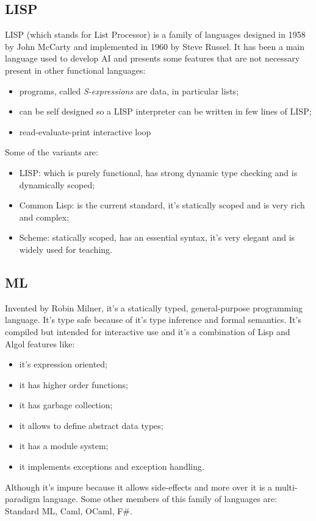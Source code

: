 \subsection{LISP}
LISP (which stands for List Processor) is a family of languages designed in 1958 by John McCarty and implemented in 1960 by Steve Russel.
It has been a main language used to develop AI and presents some features that are not necessary present in other functional languages:
\begin{itemize}
    \item programs, called \emph{S-expressions} are data, in particular lists;
    \item can be self designed so a LISP interpreter can be written in few lines of LISP;
    \item read-evaluate-print interactive loop
\end{itemize}

Some of the variants are:
\begin{itemize}
    \item LISP: which is purely functional, has strong dynamic type checking and is dynamically scoped;
    \item Common Lisp: is the current standard, it's statically scoped and is very rich and complex;
    \item Scheme: statically scoped, has an essential syntax, it's very elegant and is widely used for teaching.
\end{itemize}

\subsection{ML}
Invented by Robin Milner, it's a statically typed, general-purpose programming language.
It's type safe because of it's type inference and formal semantics.
It's compiled but intended for interactive use and it's a combination of Lisp and Algol features like:
\begin{itemize}
    \item it's expression oriented;
    \item it has higher order functions;
    \item it has garbage collection;
    \item it allows to define abstract data types;
    \item it has a module system;
    \item it implements exceptions and exception handling.
\end{itemize}
Although it's impure because it allows side-effects and more over it is a multi-paradigm language.
Some other members of this family of languages are: Standard ML, Caml, OCaml, F\#.

